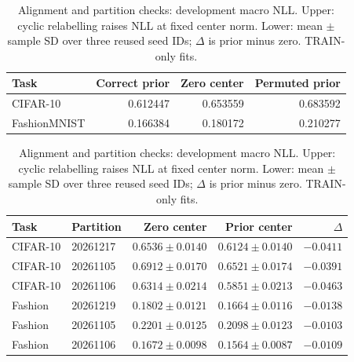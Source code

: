\begin{table}[!htb]\centering\small\setlength{\tabcolsep}{3pt}
\caption{Alignment and partition checks: development macro NLL. Upper: cyclic relabelling raises NLL at fixed center norm. Lower: mean $\pm$ sample SD over three reused seed IDs; $\Delta$ is prior minus zero. TRAIN-only fits.}\label{tab:mechanism}\label{tab:partitiondev}
\begin{tabular}{lrrr}\toprule
Task & Correct prior & Zero center & Permuted prior\\\midrule
CIFAR-10 & 0.612447 & 0.653559 & 0.683592\\
FashionMNIST & 0.166384 & 0.180172 & 0.210277\\\bottomrule
\end{tabular}
\par\medskip
\begin{tabular}{llrrr}
\toprule
Task & Partition & Zero center & Prior center & $\Delta$ \\
\midrule
CIFAR-10 & 20261217 & $0.6536\pm0.0140$ & $0.6124\pm0.0140$ & $-0.0411$ \\
CIFAR-10 & 20261105 & $0.6912\pm0.0170$ & $0.6521\pm0.0174$ & $-0.0391$ \\
CIFAR-10 & 20261106 & $0.6314\pm0.0214$ & $0.5851\pm0.0213$ & $-0.0463$ \\
Fashion & 20261219 & $0.1802\pm0.0121$ & $0.1664\pm0.0116$ & $-0.0138$ \\
Fashion & 20261105 & $0.2201\pm0.0125$ & $0.2098\pm0.0123$ & $-0.0103$ \\
Fashion & 20261106 & $0.1672\pm0.0098$ & $0.1564\pm0.0087$ & $-0.0109$ \\
\bottomrule
\end{tabular}
\end{table}
